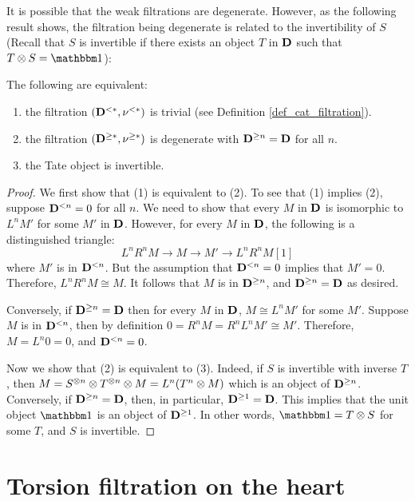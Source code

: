 It is possible that the weak filtrations are degenerate. However, as 
the following result shows, the filtration being degenerate is 
related to the invertibility of $S$ (Recall that $S$ is 
invertible if there exists an object $T$ in $\mathbf{D}$ such that $T 
\tensor S = \Unit$):

\begin{prop}\label{prop_filt_trivial_cond}
The following are equivalent:
\begin{enumerate}
\item the filtration $(\mathbf{D}^{< *}, \nu^{< *})$ is trivial
(see Definition \ref{def_cat_filtration}).

\item the filtration $(\mathbf{D}^{\geq *}, \nu^{\geq *})$ is 
degenerate with $\mathbf{D}^{\geq n} = \mathbf{D}$ for all $n$.

\item the Tate object is invertible.
\end{enumerate}
\end{prop}
\begin{proof}
We first show that (1) is equivalent to (2). To see that (1) implies
(2), suppose $\mathbf{D}^{< n} = 0$ for all $n$. We need to show
that every $M$ in $\mathbf{D}$ is isomorphic to $L^n M'$ for some $M'$
in $\mathbf{D}$. However, for every $M$ in $\mathbf{D}$, the following is
a distinguished triangle:
\[
L^n R^n M \to M \to M' \to L^n R^n M[1]
\]
where $M'$ is in $\mathbf{D}^{< n}$. But the assumption that
$\mathbf{D}^{< n} = 0$ implies that $M' = 0$. Therefore, $L^n R^n M
\cong M$. It follows that $M$ is in $\mathbf{D}^{\geq n}$, and
$\mathbf{D}^{\geq n} = \mathbf{D}$ as desired.

Conversely, if $\mathbf{D}^{\geq n} = \mathbf{D}$ then for every
$M$ in $\mathbf{D}$, $M \cong L^n M'$ for some $M'$. Suppose $M$ is in
$\mathbf{D}^{< n}$, then by definition $0 = R^n M = R^nL^n M' \cong M'$.
Therefore, $M = L^n 0 = 0$, and $\mathbf{D}^{< n} = 0$.

Now we show that (2) is equivalent to (3). Indeed, if $S$ is 
invertible with inverse $T$, then $M = S^{\otimes n} \otimes 
T^{\otimes n} \otimes M = L^n(T^n \otimes M)$ which is an object 
of $\mathbf{D}^{\geq n}$. Conversely, if $\mathbf{D}^{\geq n} = 
\mathbf{D}$, then, in particular, $\mathbf{D}^{\geq 1} = \mathbf{D}$. This
implies that the unit object $\Unit$ is an object of $\mathbf{D}^{\geq 1}$.
In other words, $\Unit = T \tensor S$ for some $T$, and $S$ is
invertible.
\end{proof}

\section{Torsion filtration on the heart}

